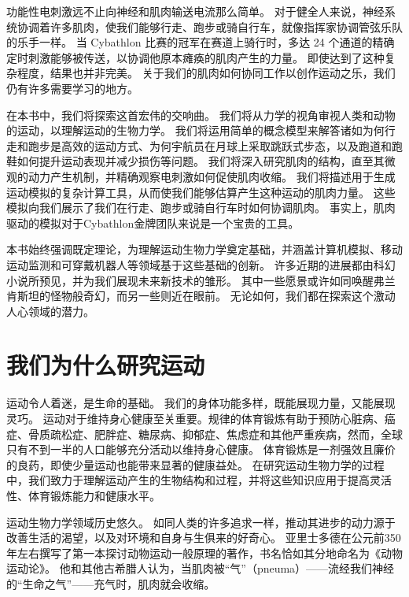 功能性电刺激远不止向神经和肌肉输送电流那么简单。
对于健全人来说，神经系统协调着许多肌肉，使我们能够行走、跑步或骑自行车，就像指挥家协调管弦乐队的乐手一样。
当 Cybathlon 比赛的冠军在赛道上骑行时，多达 24 个通道的精确定时刺激能够被传送，以协调他原本瘫痪的肌肉产生的力量。
即使达到了这种复杂程度，结果也并非完美。
关于我们的肌肉如何协同工作以创作运动之乐，我们仍有许多需要学习的地方。


在本书中，我们将探索这首宏伟的交响曲。
我们将从力学的视角审视人类和动物的运动，以理解运动的生物力学。
我们将运用简单的概念模型来解答诸如为何行走和跑步是高效的运动方式、为何宇航员在月球上采取跳跃式步态，以及跑道和跑鞋如何提升运动表现并减少损伤等问题。
我们将深入研究肌肉的结构，直至其微观的动力产生机制，并精确观察电刺激如何促使肌肉收缩。
我们将描述用于生成运动模拟的复杂计算工具，从而使我们能够估算产生这种运动的肌肉力量。
这些模拟向我们展示了我们在行走、跑步或骑自行车时如何协调肌肉。
事实上，肌肉驱动的模拟对于Cybathlon金牌团队来说是一个宝贵的工具。


本书始终强调既定理论，为理解运动生物力学奠定基础，并涵盖计算机模拟、移动运动监测和可穿戴机器人等领域基于这些基础的创新。
许多近期的进展都由科幻小说所预见，并为我们展现未来新技术的雏形。
其中一些愿景或许如同唤醒弗兰肯斯坦的怪物般奇幻，而另一些则近在眼前。
无论如何，我们都在探索这个激动人心领域的潜力。






\section{我们为什么研究运动}

运动令人着迷，是生命的基础。
我们的身体功能多样，既能展现力量，又能展现灵巧。
运动对于维持身心健康至关重要。规律的体育锻炼有助于预防心脏病、癌症、骨质疏松症、肥胖症、糖尿病、抑郁症、焦虑症和其他严重疾病，然而，全球只有不到一半的人口能够充分活动以维持身心健康。
体育锻炼是一剂强效且廉价的良药，即使少量运动也能带来显著的健康益处。
在研究运动生物力学的过程中，我们致力于理解运动产生的生物结构和过程，并将这些知识应用于提高灵活性、体育锻炼能力和健康水平。


运动生物力学领域历史悠久。
如同人类的许多追求一样，推动其进步的动力源于改善生活的渴望，以及对环境和自身与生俱来的好奇心。
亚里士多德在公元前350年左右撰写了第一本探讨动物运动一般原理的著作，书名恰如其分地命名为《动物运动论》。
他和其他古希腊人认为，当肌肉被“气”（pneuma）——流经我们神经的“生命之气”——充气时，肌肉就会收缩。


